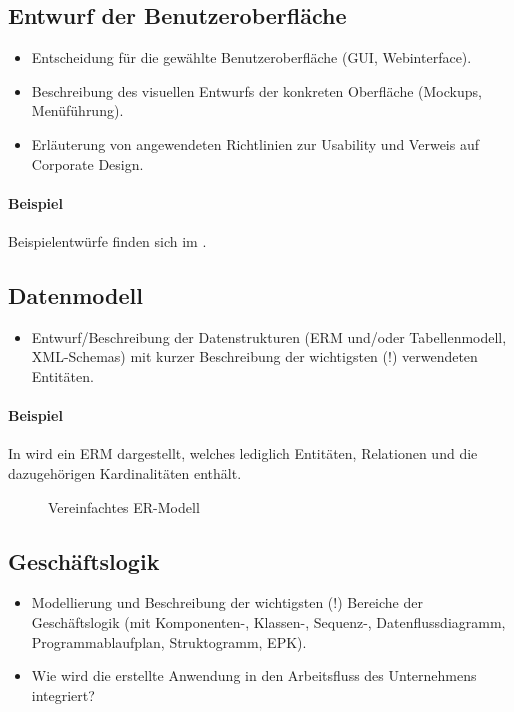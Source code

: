 \subsection{Entwurf der Benutzeroberfläche}
\label{sec:Benutzeroberflaeche} 
\begin{itemize}
	\item Entscheidung für die gewählte Benutzeroberfläche (\zB GUI, Webinterface).
	\item Beschreibung des visuellen Entwurfs der konkreten Oberfläche (\zB Mockups, Menüführung).
	\item \Ggfs Erläuterung von angewendeten Richtlinien zur Usability und Verweis auf Corporate Design.
\end{itemize}

\paragraph{Beispiel}
Beispielentwürfe finden sich im .


\subsection{Datenmodell}
\label{sec:Datenmodell}

\begin{itemize}
	\item Entwurf/Beschreibung der Datenstrukturen (\zB \acs{ERM} und/oder Tabellenmodell, \acs{XML}-Schemas) mit kurzer Beschreibung der wichtigsten (!) verwendeten Entitäten.
\end{itemize}

\paragraph{Beispiel}
In  wird ein \ac{ERM} dargestellt, welches lediglich Entitäten, Relationen und die dazugehörigen Kardinalitäten enthält. 

\begin{figure}[htb]
\centering
{}
\caption{Vereinfachtes ER-Modell}
\label{fig:ER}
\end{figure} 


\subsection{Geschäftslogik}
\label{sec:Geschaeftslogik}

\begin{itemize}
	\item Modellierung und Beschreibung der wichtigsten (!) Bereiche der Geschäftslogik (\zB mit Kom\-po\-nen\-ten-, Klassen-, Sequenz-, Datenflussdiagramm, Programmablaufplan, Struktogramm, \ac{EPK}).
	\item Wie wird die erstellte Anwendung in den Arbeitsfluss des Unternehmens integriert?
\end{itemize}

